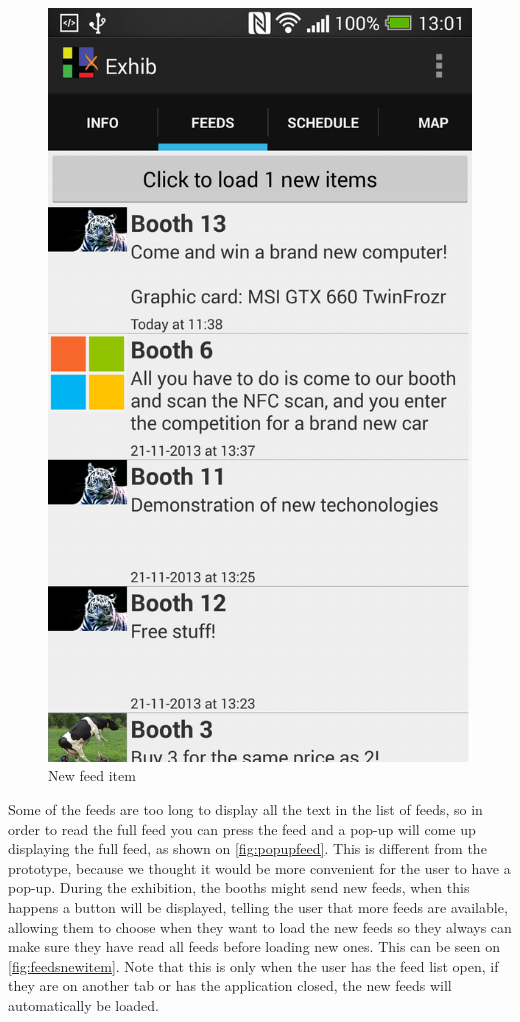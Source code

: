 \begin{figure}[H]
\begin{minipage}[b]{0.5\columnwidth}
\includegraphics[width=0.7\columnwidth]{img/finaldesign/feedsnewitem.png}
\caption{New feed item}
\label{fig:feedsnewitem}
\end{minipage}
\end{figure}

Some of the feeds are too long to display all the text in the list of feeds, so in order to read the full feed you can press the feed and a pop-up will come up displaying the full feed, as shown on \autoref{fig:popupfeed}. This is different from the prototype, because we thought it would be more convenient for the user to have a pop-up. During the exhibition, the booths might send new feeds, when this happens a button will be displayed, telling the user that more feeds are available, allowing them to choose when they want to load the new feeds so they always can make sure they have read all feeds before loading new ones. This can be seen on \autoref{fig:feedsnewitem}. Note that this is only when the user has the feed list open, if they are on another tab or has the application closed, the new feeds will automatically be loaded.

